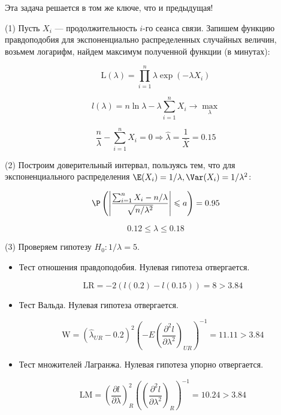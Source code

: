 \documentclass[pdftex,11pt,openany]{book}\usepackage[]{graphicx}\usepackage[]{color}
\begin{document}
\begin{solution}
Эта задача решается в том же ключе, что и предыдущая!

(1) Пусть $X_i$ --- продолжительность $i$-го сеанса связи. Запишем функцию правдоподобия для экспоненциально распределенных случайных величин, возьмем логарифм, найдем максимум полученной функции (в минутах):

\[\text{L}(\lambda) = \prod_{i=1}^n \lambda \exp(-\lambda X_i)\]

\[l(\lambda) = n \ln \lambda - \lambda \sum_{i=1}^n X_i \to \max_\lambda\]

\[\frac{n}{\lambda} - \sum_{i=1}^{n}X_i = 0 \Rightarrow \hat{\lambda} = \frac{1}{\bar{X}}=0.15\]

(2) Построим доверительный интервал, пользуясь тем, что для экспоненциального распределения $\E(X_i) = 1/\lambda, \Var(X_i) = 1/\lambda^2$:

\[\P\left( \left|\frac{\sum_{i=1}^{n}X_i-n/\lambda}{\sqrt{n/\lambda^2}}\right|\leqslant a\right)=0.95\]

\[0.12 \leqslant \lambda \leqslant 0.18\]

(3) Проверяем гипотезу $H_0: 1/\lambda = 5$.

\begin{itemize}
  \item Тест отношения правдоподобия. Нулевая гипотеза отвергается.

	\[\text{LR} = -2(l(0.2)-l(0.15)) = 8 > 3.84\]

	\item Тест Вальда. Нулевая гипотеза отвергается.

	\[\text{W} = \left(\hat{\lambda}_{UR} - 0.2\right) ^2\left( -E\left(\frac{\partial^2l}{\partial \lambda^2}\right)_{UR}\right)^{-1} = 11.11 > 3.84 \]

		\item Тест множителей Лагранжа. Нулевая гипотеза упорно отвергается.

	\[\text{LM} = \left( \frac{\partial l}{\partial\lambda}\right)_R^2 \left( \left(\frac{\partial^2l}{\partial \lambda^2}\right)_{R}\right)^{-1} = 10.24 > 3.84 \]
\end{itemize}
\end{solution}
\end{document}
